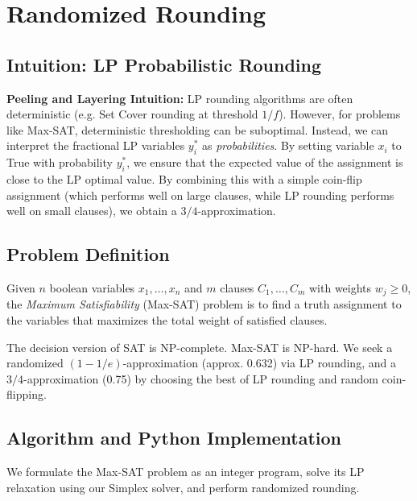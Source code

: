 \setcounter{chapter}{15}
\chapter{Randomized Rounding}
\label{ch:randomized_rounding}

\section{Intuition: LP Probabilistic Rounding}

\begin{intuitionbox}
\textbf{Peeling and Layering Intuition:} LP rounding algorithms are often deterministic (e.g. Set Cover rounding at threshold $1/f$). However, for problems like Max-SAT, deterministic thresholding can be suboptimal. Instead, we can interpret the fractional LP variables $y_i^*$ as \emph{probabilities}. By setting variable $x_i$ to True with probability $y_i^*$, we ensure that the expected value of the assignment is close to the LP optimal value. By combining this with a simple coin-flip assignment (which performs well on large clauses, while LP rounding performs well on small clauses), we obtain a $3/4$-approximation.
\end{intuitionbox}

\section{Problem Definition}
Given $n$ boolean variables $x_1, \dots, x_n$ and $m$ clauses $C_1, \dots, C_m$ with weights $w_j \ge 0$, the \emph{Maximum Satisfiability} (Max-SAT) problem is to find a truth assignment to the variables that maximizes the total weight of satisfied clauses.

The decision version of SAT is NP-complete. Max-SAT is NP-hard. We seek a randomized $(1 - 1/e)$-approximation (approx. 0.632) via LP rounding, and a $3/4$-approximation (0.75) by choosing the best of LP rounding and random coin-flipping.

\section{Algorithm and Python Implementation}
We formulate the Max-SAT problem as an integer program, solve its LP relaxation using our Simplex solver, and perform randomized rounding.

